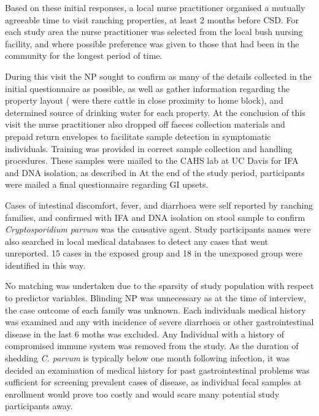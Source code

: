 \documentclass[12pt]{article}
\begin{document}
		Based on these initial responses, a local nurse practitioner organised a mutually agreeable time to visit ranching properties, at least 2 months before CSD.	%
		For each study area the nurse practitioner was selected from the local bush nursing facility, and where possible preference was given to those that had been in the community for the longest period of time.


		During this visit the NP sought to confirm as many of the details collected in the initial questionnaire as possible, as well as gather information regarding the property layout ( were there cattle in close proximity to home block), and determined source of drinking water for each property.
		At the conclusion of this visit the nurse practitioner also dropped off faeces collection materials and prepaid return envelopes to facilitate sample detection in symptomatic individuals. 		%
		Training was provided in correct sample collection and handling procedures.
		These samples were mailed to the CAHS lab at UC Davis for IFA and DNA isolation,  as described in \cite{Atwill1999}
		At the end of the study period, participants were mailed a final questionnaire regarding GI upsets.
		

		Cases of intestinal discomfort, fever, and diarrhoea were self reported by ranching families, and confirmed with IFA and DNA isolation on stool sample to confirm \emph{Cryptosporidium parvum} was the causative agent.
		Study participants names were also searched in local medical databases to detect any cases that went unreported. 15 cases in the exposed group and 18 in the unexposed group were identified in this way. 
		
		No matching was undertaken due to the sparsity of study population with respect to predictor variables. Blinding NP was unnecessary as at the time of interview, the case outcome of each family was unknown.
		Each individuals medical history was examined and any with incidence of severe diarrhoea or other gastrointestinal disease in the last 6 moths was excluded. Any Individual with a history of compromised immune system was removed from the study.
		As the duration of shedding \emph{C. parvum} is typically below one month following infection, it was decided an examination of medical history for past gastrointestinal problems was sufficient for screening prevalent cases of disease, as individual fecal samples at enrollment would prove too costly and would scare many potential study participants away.
		
\end{document}
